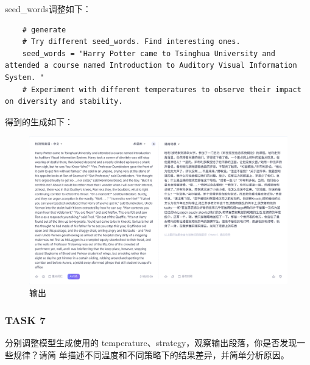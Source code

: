 \documentclass{article}%
\begin{document}
seed\_words调整如下：
\begin{lstlisting}
    # generate
    # Try different seed_words. Find interesting ones.
    seed_words = "Harry Potter came to Tsinghua University and attended a course named Introduction to Auditory Visual Information System. "
    # Experiment with different temperatures to observe their impact on diversity and stability.
\end{lstlisting}
得到的生成如下：
\begin{figure}[H]
    \centering
    \includegraphics[width=0.9\linewidth]{../output/output1.png}
    \caption{输出}
\end{figure}

\subsubsection{TASK 7}
分别调整模型生成使用的 temperature、strategy，观察输出段落，你是否发现一些规律？请简
单描述不同温度和不同策略下的结果差异，并简单分析原因。
\end{document}
